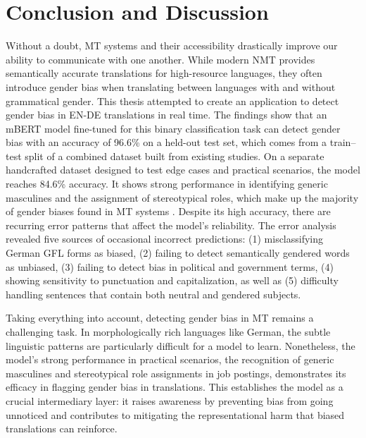 \chapter{Conclusion and Discussion}
   Without a doubt, MT systems and their accessibility drastically improve our ability to communicate with one another. While modern NMT provides semantically accurate translations for high-resource languages, they often introduce gender bias when translating between languages with and without grammatical gender. This thesis attempted to create an application to detect gender bias in EN-DE translations in real time. The findings show that an mBERT model fine-tuned for this binary classification task can detect gender bias with an accuracy of 96.6\% on a held-out test set, which comes from a train–test split of a combined dataset built from existing studies. On a separate handcrafted dataset designed to test edge cases and practical scenarios, the model reaches 84.6\% accuracy. It shows strong performance in identifying generic masculines and the assignment of stereotypical roles, which make up the majority of gender biases found in MT systems \parencite{lardelliBuildingBridgesDataset2024,stanovskyEvaluatingGenderBias2019,pratesAssessingGenderBias2019}. Despite its high accuracy, there are recurring error patterns that affect the model's reliability. The error analysis revealed five sources of occasional incorrect predictions: (1) misclassifying German GFL forms as biased, (2) failing to detect semantically gendered words as unbiased, (3) failing to detect bias in political and government terms, (4) showing sensitivity to punctuation and capitalization, as well as (5) difficulty handling sentences that contain both neutral and gendered subjects.

   Taking everything into account, detecting gender bias in MT remains a challenging task. In morphologically rich languages like German, the subtle linguistic patterns are particularly difficult for a model to learn. Nonetheless, the model's strong performance in practical scenarios, the recognition of generic masculines and stereotypical role assignments in job postings, demonstrates its efficacy in flagging gender bias in translations. This establishes the model as a crucial intermediary layer: it raises awareness by preventing bias from going unnoticed and contributes to mitigating the representational harm that biased translations can reinforce.

